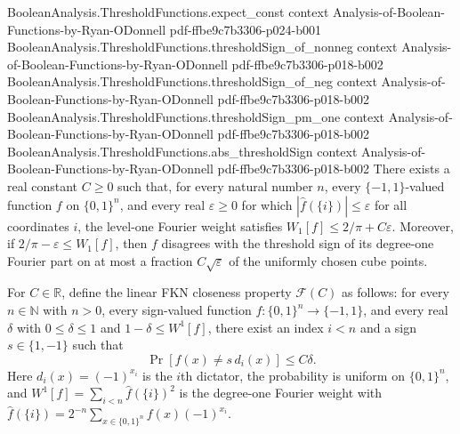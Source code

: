 \begin{theorem}
\proofstep
  {BooleanAnalysis.ThresholdFunctions.expect_const}
  {context}
  {Analysis-of-Boolean-Functions-by-Ryan-ODonnell}
  {pdf-ffbe9c7b3306-p024-b001}
\proofstep
  {BooleanAnalysis.ThresholdFunctions.thresholdSign_of_nonneg}
  {context}
  {Analysis-of-Boolean-Functions-by-Ryan-ODonnell}
  {pdf-ffbe9c7b3306-p018-b002}
\proofstep
  {BooleanAnalysis.ThresholdFunctions.thresholdSign_of_neg}
  {context}
  {Analysis-of-Boolean-Functions-by-Ryan-ODonnell}
  {pdf-ffbe9c7b3306-p018-b002}
\proofstep
  {BooleanAnalysis.ThresholdFunctions.thresholdSign_pm_one}
  {context}
  {Analysis-of-Boolean-Functions-by-Ryan-ODonnell}
  {pdf-ffbe9c7b3306-p018-b002}
\proofstep
  {BooleanAnalysis.ThresholdFunctions.abs_thresholdSign}
  {context}
  {Analysis-of-Boolean-Functions-by-Ryan-ODonnell}
  {pdf-ffbe9c7b3306-p018-b002}
There exists a real constant $C\ge0$ such that, for every natural number $n$, every
$\{-1,1\}$-valued function $f$ on $\{0,1\}^n$, and every real $\varepsilon\ge0$ for
which $|\widehat f(\{i\})|\le\varepsilon$ for all coordinates $i$, the level-one Fourier
weight satisfies $W_1[f]\le 2/\pi+C\varepsilon$. Moreover, if $2/\pi-\varepsilon\le
W_1[f]$, then $f$ disagrees with the threshold sign of its degree-one Fourier part on at
most a fraction $C\sqrt{\varepsilon}$ of the uniformly chosen cube points.
\end{theorem}

\begin{definition}
\leanok
{}
For $C\in\mathbb R$, define the linear FKN closeness property $\mathcal F(C)$ as follows: for every $n\in\mathbb N$ with $n>0$, every sign-valued function $f:\{0,1\}^n\to\{-1,1\}$, and every real $\delta$ with $0\le\delta\le1$ and $1-\delta\le W^1[f]$, there exist an index $i<n$ and a sign $s\in\{1,-1\}$ such that
\[
\Pr[f(x)\ne s\,d_i(x)]\le C\delta.
\]
Here $d_i(x)=(-1)^{x_i}$ is the $i$th dictator, the probability is uniform on $\{0,1\}^n$, and $W^1[f]=\sum_{i<n}\widehat f(\{i\})^2$ is the degree-one Fourier weight with $\widehat f(\{i\})=2^{-n}\sum_{x\in\{0,1\}^n}f(x)(-1)^{x_i}$.
\end{definition}

